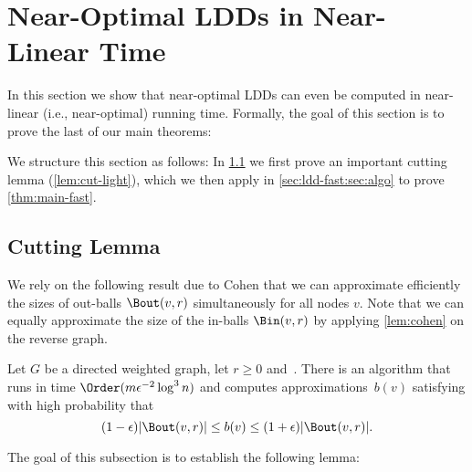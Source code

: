 \section{Near-Optimal LDDs in Near-Linear Time} \label{sec:ldd-fast}
In this section we show that near-optimal LDDs can even be computed in near-linear (i.e., near-optimal) running time. Formally, the goal of this section is to prove the last of our main theorems:

\thmMainFast*

We structure this section as follows: In \cref{sec:ldd-fast:sec:cutting} we first prove an important cutting lemma (\cref{lem:cut-light}), which we then apply in \cref{sec:ldd-fast:sec:algo} to prove \cref{thm:main-fast}.

\subsection{Cutting Lemma} \label{sec:ldd-fast:sec:cutting}
We rely on the following result due to Cohen that we can approximate efficiently the sizes of out-balls $\Bout(v, r)$ simultaneously for all nodes $v$. Note that we can equally approximate the size of the in-balls $\Bin(v, r)$ by applying \cref{lem:cohen} on the reverse graph.

\begin{lemma} \label{lem:cohen}
Let $G$ be a directed weighted graph, let $r \geq 0$ and~. There is an algorithm that runs in time $\Order(m \epsilon^{-2} \log^3 n)$ and computes approximations~$b(v)$ satisfying with high probability that
\begin{equation*}
    (1 - \epsilon) |\Bout(v, r)| \leq b(v) \leq (1 + \epsilon) |\Bout(v, r)|.
\end{equation*}
\end{lemma}

The goal of this subsection is to establish the following lemma:

